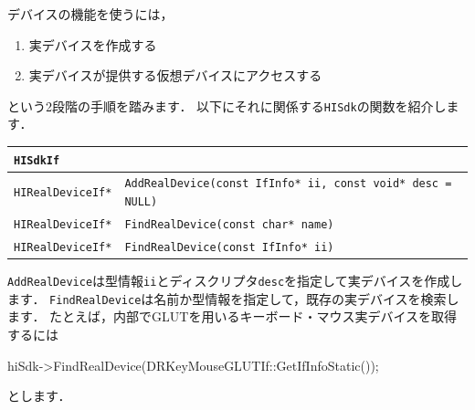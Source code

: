 \KLUDGE デバイスの機能を使うには，
\begin{enumerate}
\item 実デバイスを作成する
\item 実デバイスが提供する仮想デバイスにアクセスする
\end{enumerate}
\KLUDGE という2段階の手順を踏みます．
\KLUDGE 以下にそれに関係する\texttt{HISdk}の関数を紹介します．
\begin{center}
\begin{tabular}{p{.25\hsize}p{.65\hsize}}
\texttt{HISdkIf}																		\\ \midrule
\texttt{HIRealDeviceIf*}	& \texttt{AddRealDevice(const IfInfo* ii, const void* desc = NULL)} \\
\texttt{HIRealDeviceIf*}	& \texttt{FindRealDevice(const char* name)} \\
\texttt{HIRealDeviceIf*}	& \texttt{FindRealDevice(const IfInfo* ii)}
\end{tabular}
\end{center}
\texttt{AddRealDevice}は型情報\texttt{ii}とディスクリプタ\texttt{desc}を指定して実デバイスを作成します．
\texttt{FindRealDevice}は名前か型情報を指定して，既存の実デバイスを検索します．
\KLUDGE たとえば，内部でGLUTを用いるキーボード・マウス実デバイスを取得するには
\begin{sourcecode}
hiSdk->FindRealDevice(DRKeyMouseGLUTIf::GetIfInfoStatic());
\end{sourcecode}
\KLUDGE とします．

